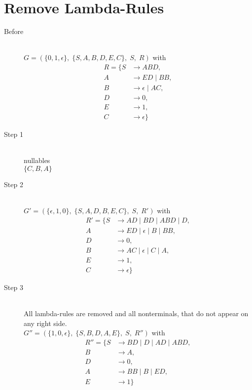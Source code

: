 \documentclass{article}
\begin{document}
\section{Remove Lambda-Rules}

\begin{description}
	\item[Before] \hfill \\ 
		$G=\left(\{	0, 1, \epsilon\},\;\{ S, A, B, D, E, C\},\;S,\;R\right)$ with
	\begin{align*}
		R=\{	S &\rightarrow ABD, \\ 
		A &\rightarrow ED\;|\;BB, \\ 
		B &\rightarrow \epsilon\;|\;AC, \\ 
		D &\rightarrow 0, \\ 
		E &\rightarrow 1, \\ 
		C &\rightarrow \epsilon\}
	\end{align*}
	\item[Step 1] \hfill \\ 
	nullables\\ 
	$\{C, B, A\}$
	\item[Step 2] \hfill \\ 
		$G'=\left(\{	\epsilon, 1, 0\},\;\{ S, A, D, B, E, C\},\;S,\;R'\right)$ with
	\begin{align*}
		R'=\{	S &\rightarrow AD\;|\;BD\;|\;ABD\;|\;D, \\ 
		A &\rightarrow ED\;|\;\epsilon\;|\;B\;|\;BB, \\ 
		D &\rightarrow 0, \\ 
		B &\rightarrow AC\;|\;\epsilon\;|\;C\;|\;A, \\ 
		E &\rightarrow 1, \\ 
		C &\rightarrow \epsilon\}
	\end{align*}
	\item[Step 3] \hfill \\ 
	All lambda-rules are removed and all nonterminals, that do not appear on any right side.\\ 
	$G''=\left(\{	1, 0, \epsilon\},\;\{ S, B, D, A, E\},\;S,\;R''\right)$ with
	\begin{align*}
		R''=\{	S &\rightarrow BD\;|\;D\;|\;AD\;|\;ABD, \\ 
		B &\rightarrow A, \\ 
		D &\rightarrow 0, \\ 
		A &\rightarrow BB\;|\;B\;|\;ED, \\ 
		E &\rightarrow 1\}
	\end{align*}
\end{description}
\end{document}
